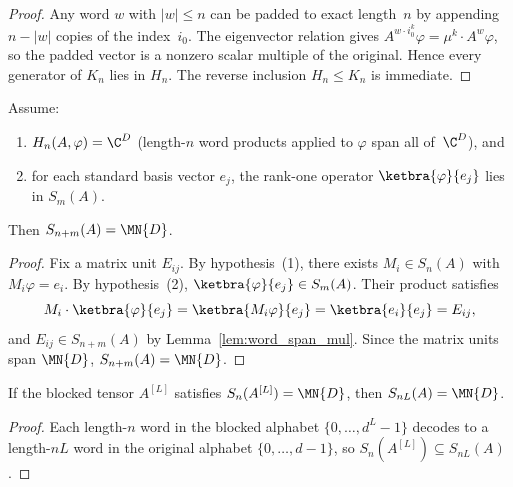 \begin{proof}
    \leanok
    Any word $w$ with $|w| \le n$ can be padded to exact
    length~$n$ by appending $n - |w|$ copies of the index~$i_0$.
    The eigenvector relation gives
    $A^{w \cdot i_0^k} \varphi = \mu^k \cdot A^w \varphi$,
    so the padded vector is a nonzero scalar multiple
    of the original.
    Hence every generator of $K_n$ lies in $H_n$.
    The reverse inclusion $H_n \le K_n$ is immediate.
\end{proof}

\begin{theorem}%
    \label{thm:lemma2b_assembly}
    \leanok
    Assume:
    \begin{enumerate}
        \item $H_n(A, \varphi) = \C^D$
              (length-$n$ word products applied to $\varphi$
              span all of~$\C^D$), and
        \item for each standard basis vector $e_j$,
              the rank-one operator
              $\ketbra{\varphi}{e_j}$
              lies in $S_m(A)$.
    \end{enumerate}
    Then $S_{n+m}(A) = \MN{D}$.
\end{theorem}

\begin{proof}
    \leanok
    Fix a matrix unit $E_{ij}$.
    By hypothesis~(1), there exists $M_i \in S_n(A)$
    with $M_i \varphi = e_i$.
    By hypothesis~(2), $\ketbra{\varphi}{e_j} \in S_m(A)$.
    Their product satisfies
    \[
        M_i \cdot \ketbra{\varphi}{e_j}
        = \ketbra{M_i \varphi}{e_j}
        = \ketbra{e_i}{e_j}
        = E_{ij},
    \]
    and $E_{ij} \in S_{n+m}(A)$ by
    Lemma~\ref{lem:word_span_mul}.
    Since the matrix units span $\MN{D}$,
    $S_{n+m}(A) = \MN{D}$.
\end{proof}

\begin{lemma}\label{lem:blocking_transfer}
    \leanok
    If the blocked tensor $A^{[L]}$ satisfies
    $S_n(A^{[L]}) = \MN{D}$,
    then $S_{nL}(A) = \MN{D}$.
\end{lemma}

\begin{proof}
    \leanok
    Each length-$n$ word in the blocked alphabet
    $\{0, \ldots, d^L - 1\}$ decodes to a length-$nL$ word
    in the original alphabet $\{0, \ldots, d-1\}$,
    so $S_n(A^{[L]}) \subseteq S_{nL}(A)$.
\end{proof}


